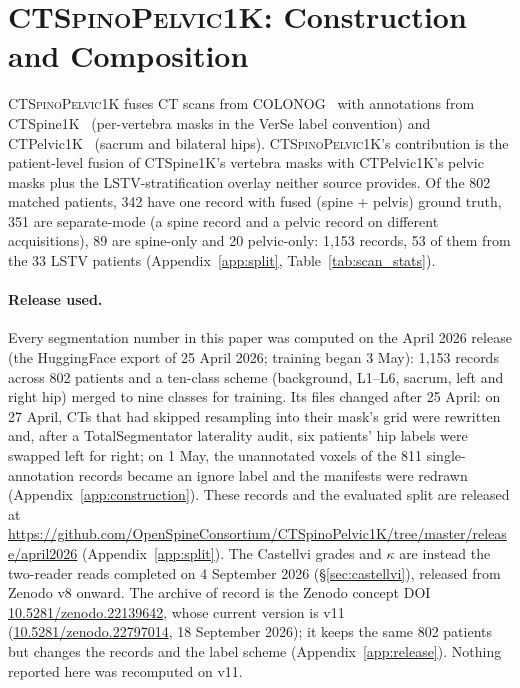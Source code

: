 \documentclass{article}
\newcommand{\dataset}{\textsc{CTSpinoPelvic1K}}
\newcommand{\TS}{TotalSegmentator}
\newcommand{\VerSe}{VerSe}
\begin{document}
\section{\dataset{}: Construction and Composition}
\label{sec:dataset}

\dataset{} fuses CT scans from
COLONOG~\citep{Smith2015DataCOLONOGRAPHY} with annotations
from CTSpine1K~\citep{Deng2021CTSpine1K:Tomography}
(per-vertebra masks in the \VerSe{} label convention) and
CTPelvic1K~\citep{Liu2021DeepModels} (sacrum and bilateral
hips). \dataset{}'s contribution is the patient-level
fusion of CTSpine1K's vertebra masks with CTPelvic1K's
pelvic masks plus the LSTV-stratification overlay neither
source provides. Of the 802 matched patients, 342 have one
record with fused (spine + pelvis) ground truth, 351 are
separate-mode (a spine record and a pelvic record on
different acquisitions), 89 are spine-only and 20
pelvic-only: 1{,}153 records, 53 of them from the 33 LSTV
patients (Appendix~\ref{app:split},
Table~\ref{tab:scan_stats}).

\paragraph{Release used.}
Every segmentation number in this paper was computed on
the April 2026 release (the HuggingFace export of 25 April
2026; training began 3 May): 1{,}153
records across 802 patients and a ten-class scheme
(background, L1--L6, sacrum, left and right hip) merged
to nine classes for training. Its files changed after
25 April: on 27 April, CTs that had skipped resampling
into their mask's grid were rewritten and, after a \TS{}
laterality audit, six patients' hip labels were swapped
left for right; on 1 May, the unannotated voxels of the
811 single-annotation records became an ignore label and
the manifests were redrawn
(Appendix~\ref{app:construction}). These records and the
evaluated split are released at
\url{https://github.com/OpenSpineConsortium/CTSpinoPelvic1K/tree/master/release/april2026} (Appendix~\ref{app:split}). The Castellvi
grades and $\kappa$ are instead the two-reader reads
completed on 4 September 2026 (\S\ref{sec:castellvi}),
released from Zenodo v8 onward.
The archive of record is the Zenodo concept DOI
\href{https://doi.org/10.5281/zenodo.22139642}{10.5281/zenodo.22139642},
whose current version is v11
(\href{https://doi.org/10.5281/zenodo.22797014}{10.5281/zenodo.22797014},
18 September 2026); it keeps the same 802 patients but
changes the records and the label scheme
(Appendix~\ref{app:release}). Nothing reported here was
recomputed on v11.
\end{document}
